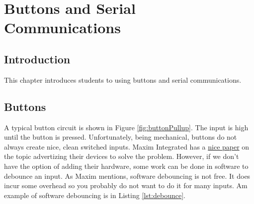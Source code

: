 \chapter{Buttons and Serial Communications}

\section{Introduction}
This chapter introduces students to using buttons and serial communications.

\section{Buttons}

A typical button circuit is shown in Figure \ref{fig:buttonPullup}. The input is high until the button is pressed.
Unfortunately, being mechanical, buttons do not always create nice, clean switched inputs. Maxim Integrated has a 
\href{https://www.maximintegrated.com/en/design/technical-documents/app-notes/2/287.html}{nice paper} on the topic
advertizing their devices to solve the problem. However, if we don't have the option of adding their hardware, some 
work can be done in software to debounce an input. As Maxim mentions, software debouncing is not free. It does incur
some overhead so you probably do not want to do it for many inputs. Am example of software debouncing is in 
Listing \ref{lst:debounce}.

